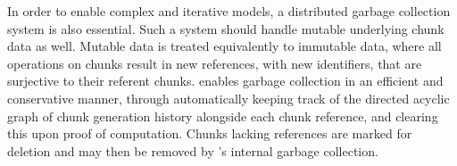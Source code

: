 In order to enable complex and iterative models, a distributed garbage collection system is also essential.
Such a system should handle mutable underlying chunk data as well.
Mutable data is treated equivalently to immutable data, where all operations on chunks result in new references, with new identifiers, that are surjective to their referent chunks.
\lsr{} enables garbage collection in an efficient and conservative manner, through automatically keeping track of the directed acyclic graph of chunk generation history alongside each chunk reference, and clearing this upon proof of computation.
Chunks lacking references are marked for deletion and may then be removed by \R{}'s internal garbage collection.

